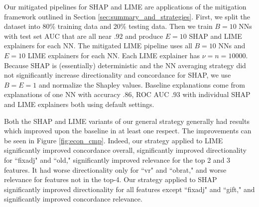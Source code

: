 \documentclass[mnsc,blindrev]{informs3}
\begin{document}
    Our mitigated pipelines for SHAP and LIME are applications of the mitigation framework outlined in Section \ref{sec:summary_and_strategies}. First, we split the dataset into 80\% training data and 20\% testing data. Then we train $B=10$ NNs with test set AUC that are all near $.92$ and produce $E=10$ SHAP and LIME explainers for each NN. The mitigated LIME pipeline uses all $B=10$ NNs and $E=10$ LIME explainers for each NN. Each LIME explainer has $\nu=n=10000$. Because SHAP is (essentially) deterministic and the NN averaging strategy did not significantly increase directionality and concordance for SHAP, we use $B=E=1$ and normalize the Shapley values. Baseline explanations come from explanations of one NN with accuracy $.86$, ROC AUC $.93$ with individual SHAP and LIME explainers both using default settings. 


    Both the SHAP and LIME variants of our general strategy generally had results which improved upon the baseline in at least one respect. The improvements can be seen in Figure \ref{fig:econ_cmp}. Indeed, our strategy applied to LIME significantly improved concordance overall, significantly improved directionality for ``fixadj" and ``old," significantly improved relevance for the top 2 and 3 features. It had  worse directionality only for ``vr" and ``obrat," and worse relevance for features not in the top-4. Our strategy applied to SHAP significantly improved directionality for all features except ``fixadj" and ``gift," and significantly improved concordance relevance. 
    
     
\end{document}
